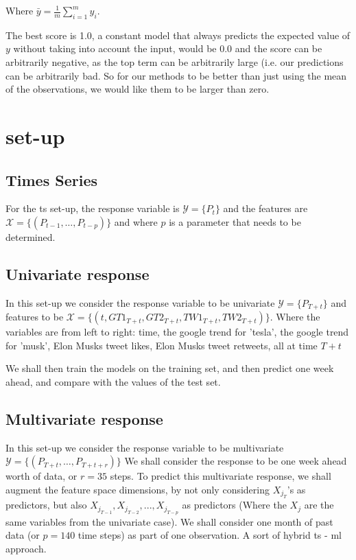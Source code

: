 Where $\bar{y} = \frac{1}{m} \sum_{i=1}^m y_i$. %

The best score is 1.0, a constant model that always predicts the expected value of $y$ without taking into account the input, would be 0.0 and the score can be arbitrarily negative, as the top term can be arbitrarily large (i.e. our predictions can be arbitrarily bad. So for our methods to be better than just using the mean of the observations, we would like them to be larger than zero.

\section{set-up}

\subsection{Times Series}
For the \acrlong{ts} set-up, the response variable is $\mathcal{Y}=\{ P_{t} \}$ and the features are $\mathcal{X} = \{ (P_{t-1}, \dots, P_{t-p}) \}$ and where $p$ is a parameter that needs to be determined.

\subsection{Univariate response}
In this set-up we consider the response variable to be univariate $\mathcal{Y}=\{P_{T+t}\}$ and features to be $ \mathcal{X} = \{ (t,GT1_{T+t},GT2_{T+t},TW1_{T+t},TW2_{T+t})  \}$. Where the variables are from left to right: time, the google trend for 'tesla', the google trend for 'musk', Elon Musks tweet likes, Elon Musks tweet retweets, all at time $T+t$

We shall then train the models on the training set, and then predict one week ahead, and compare with the values of the test set.

\subsection{Multivariate response}
In this set-up we consider the response variable to be multivariate 
$\mathcal{Y}=\{ (P_{T+t},\dots,P_{T+t+r}) \}$
We shall consider the response to be one week ahead worth of data, or $r=35$ steps. To predict this multivariate response, we shall augment the feature space dimensions, by not only considering $X_{j_T}$'s as predictors, but also $X_{j_{T-1}},X_{j_{T-2}},...,X_{j_{T-p}}$ as predictors (Where the $X_j$ are the same variables from the univariate case). We shall consider one month of past data (or $p=140$ time steps) as part of one observation. A sort of hybrid \acrlong{ts} - \acrlong{ml} approach.

